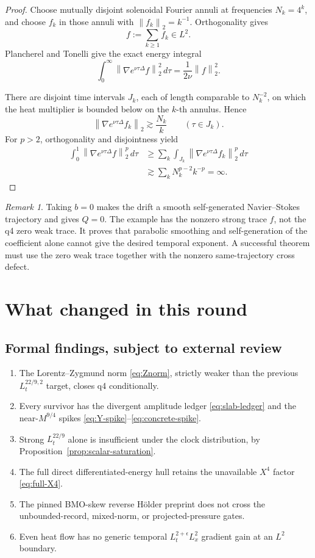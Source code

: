 \documentclass[11pt]{article}
\theoremstyle{remark}
\newtheorem{remark}[theorem]{Remark}
\newcommand{\norm}[1]{\left\|#1\right\|}
\begin{document}
\begin{proof}
Choose mutually disjoint solenoidal Fourier annuli at frequencies
\(N_k=4^k\), and choose \(f_k\) in those annuli with
\(\norm{f_k}_2=k^{-1}\).  Orthogonality gives
\[
 f:=\sum_{k\geq1}f_k\in L^2.
\]
Plancherel and Tonelli give the exact energy integral
\[
 \int_0^\infty
 \norm{\nabla e^{\nu\tau\Delta}f}_2^2\,d\tau
 =
 \frac1{2\nu}\norm{f}_2^2.
\]

There are disjoint time intervals \(J_k\), each of length comparable to
\(N_k^{-2}\), on which the heat multiplier is bounded below on the
\(k\)-th annulus.  Hence
\[
 \norm{\nabla e^{\nu\tau\Delta}f_k}_2
 \gtrsim \frac{N_k}{k}
 \qquad(\tau\in J_k).
\]
For \(p>2\), orthogonality and disjointness yield
\[
 \begin{aligned}
 \int_0^1\norm{\nabla e^{\nu\tau\Delta}f}_2^p\,d\tau
 &\geq
 \sum_k\int_{J_k}
 \norm{\nabla e^{\nu\tau\Delta}f_k}_2^p\,d\tau\\
 &\gtrsim
 \sum_kN_k^{p-2}k^{-p}
 =\infty.
 \end{aligned}
\]
\end{proof}

\begin{remark}
Taking \(b=0\) makes the drift a smooth self-generated
Navier--Stokes trajectory and gives \(Q=0\).  The example has the
nonzero strong trace \(f\), not the q4 zero weak trace.  It proves that
parabolic smoothing and self-generation of the coefficient alone cannot
give the desired temporal exponent.  A successful theorem must use the
zero weak trace together with the nonzero same-trajectory cross defect.
\end{remark}

\section{What changed in this round}

\subsection*{Formal findings, subject to external review}

\begin{enumerate}
\item The Lorentz--Zygmund norm \eqref{eq:Znorm}, strictly weaker than
the previous \(L_t^{22/9,2}\) target, closes q4 conditionally.
\item Every survivor has the divergent amplitude ledger
\eqref{eq:slab-ledger} and the near-\(M^{9/4}\) spikes
\eqref{eq:Y-spike}--\eqref{eq:concrete-spike}.
\item Strong \(L_t^{22/9}\) alone is insufficient under the clock
distribution, by Proposition~\ref{prop:scalar-saturation}.
\item The full direct differentiated-energy hull retains the unavailable
\(X^4\) factor \eqref{eq:full-X4}.
\item The pinned BMO-skew reverse H\"older preprint does not cross the
unbounded-record, mixed-norm, or projected-pressure gates.
\item Even heat flow has no generic temporal
\(L_t^{2+\epsilon}L_x^2\) gradient gain at an \(L^2\) boundary.
\end{enumerate}
\end{document}
